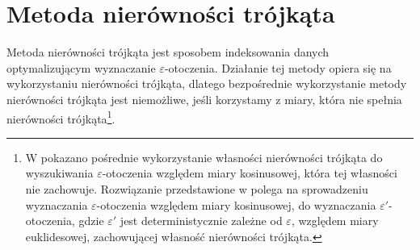 \section{Metoda nierówności trójkąta}
Metoda nierówności trójkąta jest sposobem indeksowania danych optymalizującym wyznaczanie $ \varepsilon $-otoczenia. Działanie tej metody opiera się na wykorzystaniu nierówności trójkąta, dlatego bezpośrednie wykorzystanie metody nierówności trójkąta jest niemożliwe, jeśli korzystamy z miary, która nie spełnia nierówności trójkąta\footnote{W \cite{cosbyeuc} pokazano pośrednie wykorzystanie własności nierówności trójkąta do wyszukiwania $ \varepsilon $-otoczenia względem miary kosinusowej, która tej własności nie zachowuje. Rozwiązanie przedstawione w \cite{cosbyeuc} polega na sprowadzeniu wyznaczania $\varepsilon$-otoczenia względem miary kosinusowej, do wyznaczania $\varepsilon'$-otoczenia, gdzie $\varepsilon'$ jest deterministycznie zależne od $ \varepsilon $, względem miary euklidesowej, zachowującej własność nierówności trójkąta.}.
